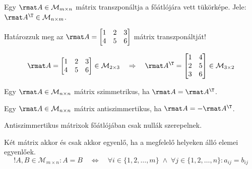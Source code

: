 \begin{definition}
  Egy $\rmat A \in \mathcal M_{m \times n}$ mátrix transzponáltja a főátlójára
  vett tükörképe. Jele: $\rmat A^\T \in \mathcal M_{n \times m}$.
\end{definition}

\begin{example}
  Határozzuk meg az $\rmat A = \begin{bmatrix}
      1 & 2 & 3 \\
      4 & 5 & 6
    \end{bmatrix}$ mátrix transzponáltját!

  \hdashrule[.8ex][x]{\dimexpr\textwidth}{1pt}{2mm 3pt}
  $$
    \rmat A = \begin{bmatrix}
      1 & 2 & 3 \\
      4 & 5 & 6
    \end{bmatrix} \in \mathcal M_{2 \times 3}
    \quad \Rightarrow \quad
    \rmat A^\T = \begin{bmatrix}
      1 & 4 \\
      2 & 5 \\
      3 & 6
    \end{bmatrix} \in \mathcal M_{3 \times 2}
  $$
\end{example}

\begin{definition}
  Egy $\rmat A \in \mathcal M_{n \times n}$ mátrix szimmetrikus, ha
  $\rmat A = \rmat A^\T$.
\end{definition}

\begin{definition}
  Egy $\rmat A \in \mathcal M_{n \times n}$ mátrix antiszimmertikus, ha
  $\rmat A = -\rmat A^\T$.
\end{definition}

\begin{note}
  Antiszimmertikus mátrixok főátlójában csak nullák szerepelnek.
\end{note}

\begin{definition}
  Két mátrix akkor és csak akkor egyenlő, ha a megfelelő helyeken álló elemei
  egyenlőek.
  $$
    !A, B \in \mathcal M_{m \times n}: A = B
    \quad \Longleftrightarrow \quad
    \forall i \in \{1, 2, \ldots, m\}
    \; \land \;
    \forall j \in \{1, 2, \ldots, n\}:
    a_{ij} = b_{ij}
  $$
\end{definition}

